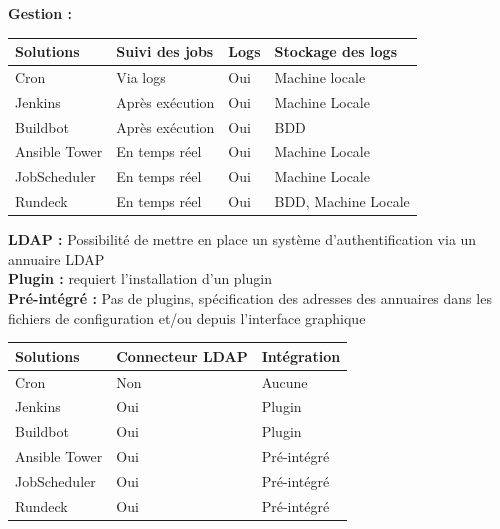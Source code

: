 \documentclass[12pt]{article}
\begin{document}
\vspace{0.5cm}

\textbf{Gestion :}

\begin{center}
\begin{tabular}{|l|l|l|l|}
\hline
Solutions     & Suivi des jobs  & Logs & Stockage des logs   \\ \hline
Cron          & Via logs        & Oui  & Machine locale      \\ \hline
Jenkins       & Après exécution & Oui  & Machine Locale      \\ \hline
Buildbot      & Après exécution & Oui  & BDD                 \\ \hline
Ansible Tower & En temps réel   & Oui  & Machine Locale      \\ \hline
JobScheduler  & En temps réel   & Oui  & Machine Locale      \\ \hline
Rundeck       & En temps réel   & Oui  & BDD, Machine Locale \\ \hline
\end{tabular}
\end{center}
\vspace{0.5cm}
\textbf{LDAP :}
Possibilité de mettre en place un système d'authentification via un annuaire LDAP
\vspace{0.2cm}
\\
\textbf{Plugin :} requiert l'installation d'un plugin
\vspace{0.2cm}
\\
\textbf{Pré-intégré :} Pas de plugins, spécification des adresses des annuaires dans les fichiers de configuration et/ou depuis l'interface graphique
\vspace{0.5cm}
\\
\begin{center}
\begin{tabular}{|l|l|l|}
\hline
Solutions     & Connecteur LDAP & Intégration \\ \hline
Cron          & Non             & Aucune      \\ \hline
Jenkins       & Oui             & Plugin      \\ \hline
Buildbot      & Oui             & Plugin      \\ \hline
Ansible Tower & Oui             & Pré-intégré \\ \hline
JobScheduler  & Oui             & Pré-intégré \\ \hline
Rundeck       & Oui             & Pré-intégré \\ \hline
\end{tabular}
\end{center}
\end{document}
